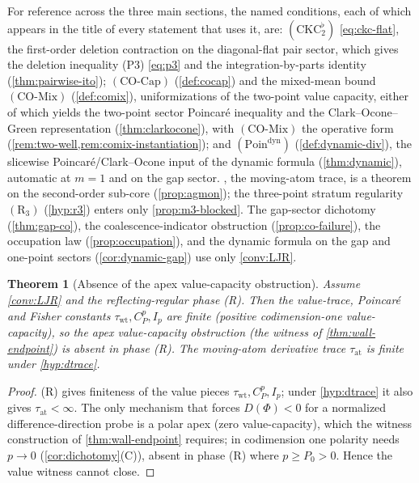 \documentclass[reqno,final,11pt]{amsart}
\theoremstyle{plain}
\newtheorem{theorem}{Theorem}[section]
\theoremstyle{definition}
\theoremstyle{remark}
\newcommand{\COcap}{(\mathrm{CO\text{-}Cap})}
\newcommand{\COmix}{(\mathrm{CO\text{-}Mix})}
\begin{document}
For reference across the three main sections, the named conditions, each of
which appears in the title of every statement that uses it, are:
$(\mathrm{CKC}_2^{\flat})$ \eqref{eq:ckc-flat}, the first-order deletion
contraction on the diagonal-flat pair sector, which gives the deletion
inequality \textnormal{(P3)} \eqref{eq:p3} and the integration-by-parts
identity (\cref{thm:pairwise-ito}); $\COcap$ (\cref{def:cocap}) and the
mixed-mean bound $\COmix$ (\cref{def:comix}), uniformizations of the
two-point value capacity, either of which yields the two-point sector
Poincar\'e inequality and the Clark--Ocone--Green representation
(\cref{thm:clarkocone}), with $\COmix$ the operative form
(\cref{rem:two-well,rem:comix-instantiation}); and
$(\mathrm{Poin}^{\mathrm{dyn}})$ (\cref{def:dynamic-div}), the slicewise
Poincar\'e/Clark--Ocone input of the dynamic formula (\cref{thm:dynamic}),
automatic at $m=1$ and on the gap sector. , the moving-atom
trace, is a theorem on the second-order sub-core (\cref{prop:agmon}); the
three-point stratum regularity $(\mathrm R_3)$ (\cref{hyp:r3}) enters only
\cref{prop:m3-blocked}. The gap-sector dichotomy (\cref{thm:gap-co}), the
coalescence-indicator obstruction (\cref{prop:co-failure}), the occupation
law (\cref{prop:occupation}), and the dynamic formula on the gap and
one-point sectors (\cref{cor:dynamic-gap}) use only \cref{conv:LJR}.

\begin{theorem}[Absence of the apex value-capacity obstruction]\label{thm:unobstruction}
Assume \cref{conv:LJR} and the reflecting-regular phase \textnormal{(R)}. Then
the value-trace, Poincar\'e and Fisher constants
$\tau_{\mathrm{wt}},C^p_P,I_p$ are finite (positive codimension-one
value-capacity), so the apex value-capacity obstruction (the witness of
\cref{thm:wall-endpoint}) is absent in phase \textnormal{(R)}. The
moving-atom derivative trace $\tau_{\mathrm{at}}$ is finite under \cref{hyp:dtrace}.
\end{theorem}
\begin{proof}
(R) gives finiteness of the value pieces
$\tau_{\mathrm{wt}},C^p_P,I_p$; under \cref{hyp:dtrace} it also gives
$\tau_{\mathrm{at}}<\infty$. The only mechanism that forces $D(\Phi)<0$ for a
normalized difference-direction probe is a polar apex (zero
value-capacity), which the witness construction of \cref{thm:wall-endpoint}
requires; in codimension one polarity
needs $p\to0$ (\cref{cor:dichotomy}(C)), absent in phase (R) where
$p\ge P_0>0$. Hence the value witness cannot close.
\end{proof}
\end{document}
